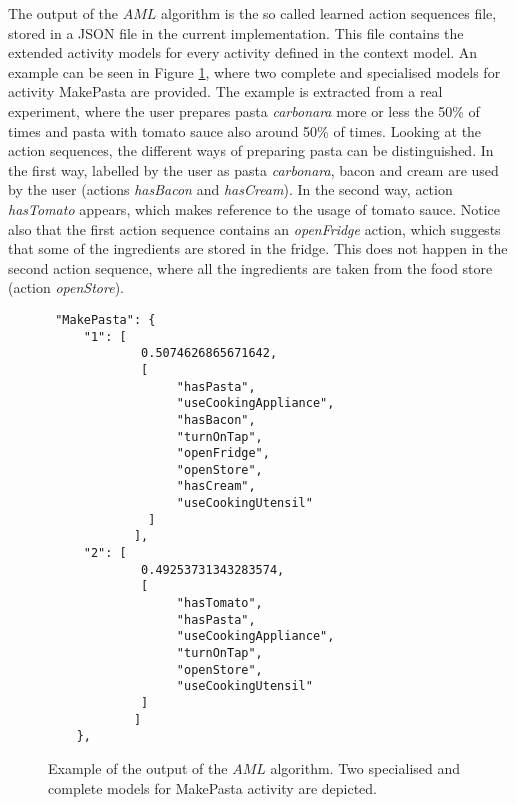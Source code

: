 The output of the $AML$ algorithm is the so called learned action sequences file, stored in a JSON file in the current implementation. This file contains the extended activity models for every activity defined in the context model. An example can be seen in Figure \ref{fig-aml-output}, where two complete and specialised models for activity MakePasta are provided. The example is extracted from a real experiment, where the user prepares pasta \textit{carbonara} more or less the 50\% of times and pasta with tomato sauce also around 50\% of times. Looking at the action sequences, the different ways of preparing pasta can be distinguished. In the first way, labelled by the user as pasta \textit{carbonara}, bacon and cream are used by the user (actions \textit{hasBacon} and \textit{hasCream}). In the second way, action \textit{hasTomato} appears, which makes reference to the usage of tomato sauce. Notice also that the first action sequence contains an \textit{openFridge} action, which suggests that some of the ingredients are stored in the fridge. This does not happen in the second action sequence, where all the ingredients are taken from the food store (action \textit{openStore}).

\begin{figure}[htbp]
\begin{small}
\begin{lstlisting}
 "MakePasta": {
     "1": [          
             0.5074626865671642, 
             [
                  "hasPasta", 
                  "useCookingAppliance", 
                  "hasBacon", 
                  "turnOnTap", 
                  "openFridge", 
                  "openStore", 
                  "hasCream", 
                  "useCookingUtensil"
              ]
            ],
     "2": [
             0.49253731343283574, 
             [
                  "hasTomato", 
                  "hasPasta", 
                  "useCookingAppliance", 
                  "turnOnTap", 
                  "openStore", 
                  "useCookingUtensil"
             ]
            ]        
    }, 

\end{lstlisting}
\end{small}
\caption{Example of the output of the $AML$ algorithm. Two specialised and complete models for MakePasta activity are depicted.}
\label{fig-aml-output}
\end{figure}


